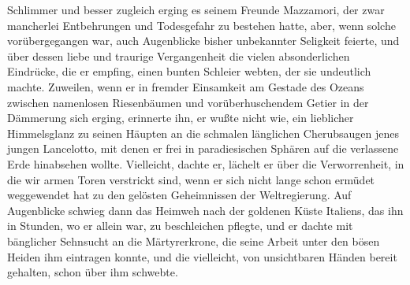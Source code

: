 Schlimmer und besser zugleich erging es seinem Freunde Mazzamori,
der zwar mancherlei Entbehrungen und Todesgefahr zu bestehen hatte,
aber, wenn solche vorübergegangen war, auch Augenblicke bisher
unbekannter Seligkeit feierte,\pagenum{[91]} und über dessen liebe
und traurige Vergangenheit die vielen absonderlichen Eindrücke, die
er empfing, einen bunten Schleier webten, der sie undeutlich
machte. Zuweilen, wenn er in fremder Einsamkeit am Gestade des
Ozeans zwischen namenlosen Riesenbäumen und vorüberhuschendem
Getier in der Dämmerung sich erging, erinnerte ihn, er wußte nicht
wie, ein lieblicher Himmelsglanz zu seinen Häupten an die schmalen
länglichen Cherubsaugen jenes jungen Lancelotto, mit denen er frei
in paradiesischen Sphären auf die verlassene Erde hinabsehen
wollte. Vielleicht, dachte er, lächelt er über die Verworrenheit,
in die wir armen Toren verstrickt sind, wenn er sich nicht lange
schon ermüdet weggewendet hat zu den gelösten Geheimnissen der
Weltregierung. Auf Augenblicke schwieg dann das Heimweh nach der
goldenen Küste Italiens, das ihn in Stunden, wo er allein war, zu
beschleichen pflegte, und er dachte mit bänglicher Sehnsucht an die
Märtyrerkrone, die seine Arbeit unter den bösen Heiden ihm
eintragen konnte, und die vielleicht, von unsichtbaren Händen
bereit gehalten, schon über ihm schwebte.



